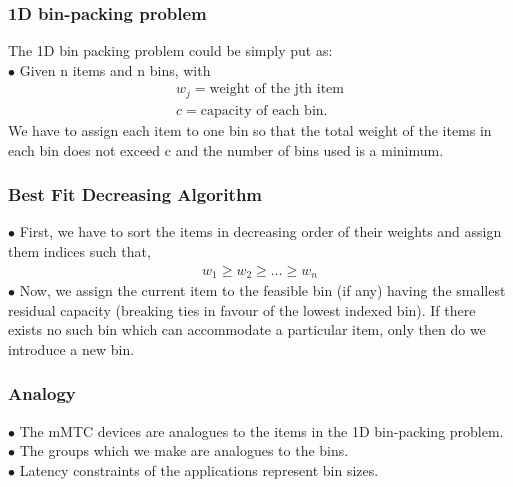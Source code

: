 \documentclass{beamer}
\begin{document}
\begin{frame}
\frametitle{1D bin-packing problem}
The 1D bin packing problem could be simply put as:\\
$\bullet$ Given n items and n bins, with   
\begin{align}
w_j = \text{weight of the jth item}\\
c = \text{capacity of each bin.}
\end{align}
We have to assign each item to one bin so that the total weight of the items in each bin does
not exceed c and the number of bins used is a minimum. 

\end{frame}


\begin{frame}
\frametitle{Best Fit Decreasing Algorithm}
$\bullet$ First, we have to sort the items in decreasing order of their weights and assign them indices such that,
\begin{align}
w_1 \geq w_2 \geq \ldots \geq w_n
\end{align}
$\bullet$ Now, we assign the current item to the feasible bin (if any) having the smallest residual capacity (breaking ties in favour of the lowest indexed bin). If there exists no such bin which can accommodate a particular item, only then do we introduce a new bin.
\end{frame}


\begin{frame}
\frametitle {Analogy}
$\bullet$ The mMTC devices are analogues to the items in the 1D bin-packing problem.\\
$\bullet$ The groups which we make are analogues to the bins.\\
$\bullet$ Latency constraints of the applications represent bin sizes.

\end{frame}
\end{document}
